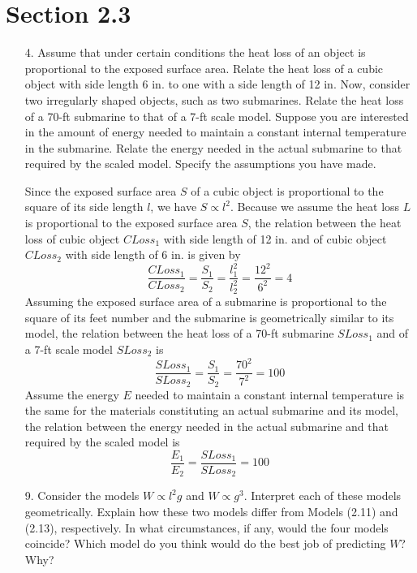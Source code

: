 \documentclass[10pt]{report}
\begin{document}
\section*{Section 2.3}
\begin{enumerate}
	\item [4.]
	Assume that under certain conditions the heat loss of an object is proportional to the exposed surface area. Relate the heat loss of a cubic object with side length 6 in. to one with a side length of 12 in. Now, consider two irregularly shaped objects, such as two submarines. Relate the heat loss of a 70-ft submarine to that of a 7-ft scale model. Suppose you are interested in the amount of energy needed to maintain a constant internal temperature in the submarine. Relate the energy needed in the actual submarine to that required by the scaled model. Specify the assumptions you have made.
	
	Since the exposed surface area $S$ of a cubic object is proportional to the square of its side length $l$, we have $S \propto l^2$. Because we assume the heat loss $L$ is proportional to the exposed surface area $S$, the relation between the heat loss of cubic object $CLoss_1$ with side length of 12 in. and of cubic object $CLoss_2$ with side length of 6 in. is given by
	\[
	\frac{CLoss_1}{CLoss_2} = \frac{S_1}{S_2} = \frac{l_1^2}{l_2^2} = \frac{12^2}{6^2} = 4
	\]
	Assuming the exposed surface area of a submarine is proportional to the square of its feet number and the submarine is geometrically similar to its model, the relation between the heat loss of a 70-ft submarine $SLoss_1$ and of a 7-ft scale model $SLoss_2$ is 
	\[
	\frac{SLoss_1}{SLoss_2} = \frac{S_1}{S_2} = \frac{70^2}{7^2} = 100
	\]
	Assume the energy $E$ needed to maintain a constant internal temperature is the same for the materials constituting an actual submarine and its model, the relation between the energy needed in the actual submarine and that required by the scaled model is
	\[
	\frac{E_1}{E_2} = \frac{SLoss_1}{SLoss_2} = 100
	\]
	
	\item [9.]
	Consider the models $W\propto l^2 g$ and $W\propto g^3$. Interpret each of these models geometrically. Explain how these two models differ from Models (2.11) and (2.13), respectively. In what circumstances, if any, would the four models coincide? Which model do you think would do the best job of predicting $W$? Why? 
	

\end{enumerate}
\end{document}
